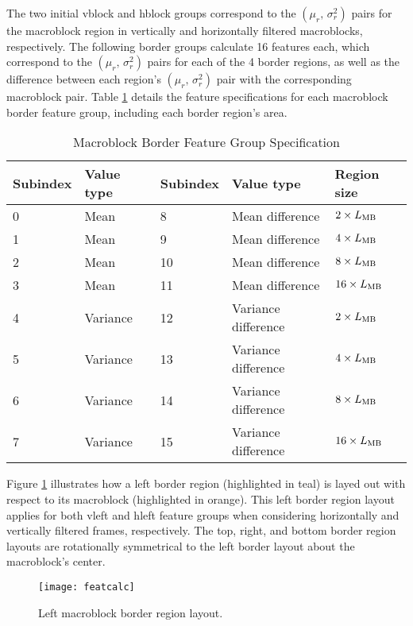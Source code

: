 The two initial vblock and hblock groups correspond to the $(\mu_r,\,\sigma^2_r)$ pairs for the macroblock region in vertically and horizontally filtered macroblocks, respectively. The following border groups calculate 16 features each, which correspond to the $(\mu_r,\,\sigma^2_r)$ pairs for each of the 4 border regions, as well as the difference between each region's $(\mu_r,\,\sigma^2_r)$ pair with the corresponding macroblock pair. Table \ref{tab:feature_group_spec} details the feature specifications for each macroblock border feature group, including each border region's area.

\begin{table}[htbp]
  \caption{Macroblock Border Feature Group Specification}
  \label{tab:feature_group_spec}
  \centering
  \begin{tabular}{lllll}
  \hline
  \textbf{Subindex} & \textbf{Value type} & \textbf{Subindex} &
  \textbf{Value type} & \textbf{Region size} \\
  \hline
  0 & Mean & 8 & Mean difference & $2\times L_{\text{MB}}$ \\  
  1 & Mean & 9 & Mean difference & $4\times L_{\text{MB}}$ \\  
  2 & Mean & 10 & Mean difference & $8\times L_{\text{MB}}$ \\  
  3 & Mean & 11 & Mean difference & $16\times L_{\text{MB}}$ \\
  4 & Variance & 12 & Variance difference & $2\times L_{\text{MB}}$ \\  
  5 & Variance & 13 & Variance difference & $4\times L_{\text{MB}}$ \\  
  6 & Variance & 14 & Variance difference & $8\times L_{\text{MB}}$ \\
  7 & Variance & 15 & Variance difference & $16\times L_{\text{MB}}$ \\
  \hline
  \end{tabular}
\end{table}

Figure \ref{fig:featcalc} illustrates how a left border region (highlighted in teal) is layed out with respect to its macroblock (highlighted in orange). This left border region layout applies for both vleft and hleft feature groups when considering horizontally and vertically filtered frames, respectively. The top, right, and bottom border region layouts are rotationally symmetrical to the left border layout about the macroblock's center.

\begin{figure} [!h]
  \centering
  
  \texttt{[image: featcalc]}
  
  \caption{Left macroblock border region layout.}
  \label{fig:featcalc}
\end{figure}

